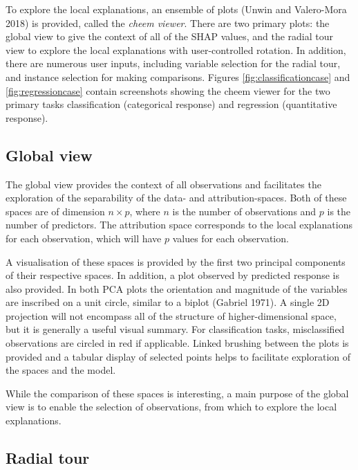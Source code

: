 \documentclass[
]{article}
\begin{document}
To explore the local explanations, an ensemble of plots (Unwin and Valero-Mora 2018) is provided, called the \emph{cheem viewer}. There are two primary plots: the global view to give the context of all of the SHAP values, and the radial tour view to explore the local explanations with user-controlled rotation. In addition, there are numerous user inputs, including variable selection for the radial tour, and instance selection for making comparisons. Figures \ref{fig:classificationcase} and \ref{fig:regressioncase} contain screenshots showing the cheem viewer for the two primary tasks classification (categorical response) and regression (quantitative response).

\hypertarget{global-view}{%
\subsection{Global view}\label{global-view}}

The global view provides the context of all observations and facilitates the exploration of the separability of the data- and attribution-spaces. Both of these spaces are of dimension \(n\times p\), where \(n\) is the number of observations and \(p\) is the number of predictors. The attribution space corresponds to the local explanations for each observation, which will have \(p\) values for each observation.

A visualisation of these spaces is provided by the first two principal components of their respective spaces. In addition, a plot observed by predicted response is also provided. In both PCA plots the orientation and magnitude of the variables are inscribed on a unit circle, similar to a biplot (Gabriel 1971). A single 2D projection will not encompass all of the structure of higher-dimensional space, but it is generally a useful visual summary. For classification tasks, misclassified observations are circled in red if applicable. Linked brushing between the plots is provided and a tabular display of selected points helps to facilitate exploration of the spaces and the model.

While the comparison of these spaces is interesting, a main purpose of the global view is to enable the selection of observations, from which to explore the local explanations.

\hypertarget{radial-tour}{%
\subsection{Radial tour}\label{radial-tour}}
\end{document}

